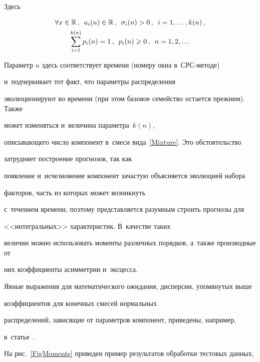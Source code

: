 Здесь


\begin{gather*}


\forall x \in \mathbb{R}\,,\enskip a_i(n)\in\mathbb{R}\,, \enskip


\sigma_i(n)>0\,,  \enskip i=1,\ldots,k(n)\,, \\%


\sum\limits_{i=1}^{k(n)}p_{i}(n)=1\,, \enskip p_{i}(n)\geqslant


0\,, \enskip n=1,2,\ldots %


\end{gather*}





Параметр $n$ здесь соответствует времени (номеру окна в~СРС-методе) 


и~подчеркивает тот факт, что параметры распределения 


эволюционируют во времени (при этом базовое семейство остается прежним). Также 


может изменяться и~величина параметра~$k(n)$, 


описывающего число компонент в~смеси вида~\eqref{Mixture}. Это обстоятельство 


затрудняет построение прогнозов, так как 


появление и~исчезновение компонент зачастую объясняется эволюцией набора 


факторов, часть из которых может возникнуть 


с~течением времени, поэтому представляется разумным строить прогнозы для 


<<интегральных>> характеристик. В~качестве таких 


величин можно использовать моменты различных порядков, а~также производные от 


них коэффициенты асимметрии и~эксцесса. 


Явные выражения для математического ожидания, дисперсии, упомянутых выше 


коэффициентов для конечных смесей нормальных 


распределений, зависящие от параметров компонент, приведены, например, 


в~статье~\cite{Gorshenin2016a}. 





На рис.~\ref{FigMoments} приведен пример результатов обработки тестовых данных, 


